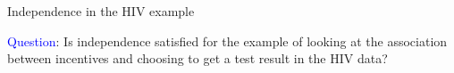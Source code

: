 \documentclass[10pt,t]{beamer}
\begin{document}
\begin{frame}{Independence in the HIV example}
	
	\textcolor{blue}{Question}: Is independence satisfied for the example of looking at the association between incentives and choosing to get a test result in the HIV data?
\end{frame}

%	
%	
%	
%	
%	
%	
%	
%	
%	
%	
%	
%	
%
%	
%	
%	
%	
%
%
%
%
%
%
%
%
%
%
%
%
%
%	
%	
%	
%	
%
%	
%	
%	
%	
%	
%	
%	
%
%	
%	
%	
%	
\end{document}

